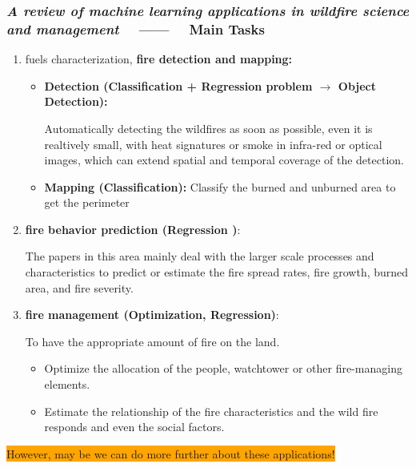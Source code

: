 \begin{frame}
    \frametitle{\textit{A review of machine learning applications in wildfire
    science and management} ~~------~~ Main Tasks}
    \begin{enumerate} 
        \item fuels characterization, \textbf{fire detection and mapping:}\\
            \begin{itemize}
                \item \textbf{Detection (Classification + Regression problem
                    $\rightarrow$ Object Detection):}

                    Automatically detecting the wildfires as soon as possible,
                    even it is realtively small, with heat signatures or smoke
                    in infra-red or optical images, which can extend  spatial
                    and temporal coverage of the detection.

                \item \textbf{Mapping (Classification):} 
                    Classify the burned and unburned area to get the perimeter
            \end{itemize}
        \item \textbf{fire behavior prediction (Regression )\footnotemark[1]}:

            The papers in this area mainly deal with the larger scale processes
            and characteristics to predict or estimate the fire spread rates,
            fire growth, burned area, and fire severity.

        \item \textbf{fire management (Optimization, Regression)}:

            To have the appropriate amount of fire on the land.
            \begin{itemize}
                \item Optimize the allocation of the people, watchtower or other
                    fire-managing elements.
                \item Estimate the relationship of the fire characteristics and
                    the wild fire responds and even the social factors.
            \end{itemize}
    \end{enumerate}
    \colorbox{orange}{However, may be we can do more further about these
    applications!}

\end{frame}

